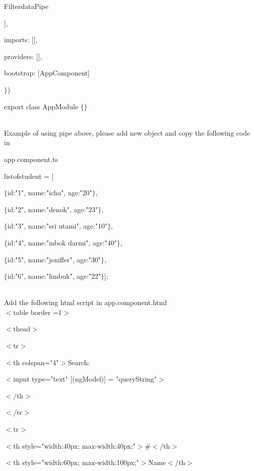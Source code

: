 \documentclass{article}
\begin{document}
  FilterdataPipe      

 ],      

 imports: [],      

 providers: [],      

 bootstrap: [AppComponent]      

\noindent $\mathrm{\}}$)      

\noindent export class AppModule $\mathrm{\{}$$\mathrm{\}}$      

\noindent \\ Example of using pipe above, please add new object and copy the following code in

\noindent app.component.ts      

\noindent listofstudent = [      

 $\mathrm{\{}$id:"1", name:"icha", age:"20"$\mathrm{\}}$,      

 $\mathrm{\{}$id:"2", name:"denok", age:"23"$\mathrm{\}}$,      

 $\mathrm{\{}$id:"3", name:"sri utami", age:"10"$\mathrm{\}}$,

\noindent $\mathrm{\{}$id:"4", name:"mbok darmi", age:"40"$\mathrm{\}}$,

\noindent $\mathrm{\{}$id:"5", name:"jeniffer", age:"30"$\mathrm{\}}$,

\noindent $\mathrm{\{}$id:"6", name:"limbuk", age:"22"$\mathrm{\}}$];

\noindent 

\noindent \\ Add the following html script in app.component.html \\

\noindent $\mathrm{<}$table border =1$\mathrm{>}$

$\mathrm{<}$thead$\mathrm{>}$

$\mathrm{<}$tr$\mathrm{>}$

$\mathrm{<}$th colspan="4"$\mathrm{>}$Search:

$\mathrm{<}$input type="text" [(ngModel)] = "queryString"$\mathrm{>}$

$\mathrm{<}$/th$\mathrm{>}$

$\mathrm{<}$/tr$\mathrm{>}$

$\mathrm{<}$tr$\mathrm{>}$

$\mathrm{<}$th style="width:40px; max-width:40px;"$\mathrm{>}$\#$\mathrm{<}$/th$\mathrm{>}$

$\mathrm{<}$th style="width:60px; max-width:100px;"$\mathrm{>}$Name$\mathrm{<}$/th$\mathrm{>}$
\end{document}
